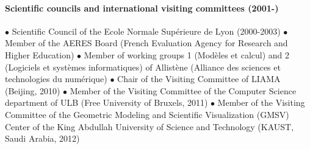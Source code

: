 \paragraph{Scientific councils and international visiting committees (2001-)} \mbox{}


$\bullet$  Scientific Council of the Ecole Normale Sup\'erieure de Lyon (2000-2003)
$\bullet$  Member of the AERES Board (French Evaluation Agency for
  Research and Higher Education)
$\bullet$  Member of working groups 1 (Mod\`eles et calcul) and 2
  (Logiciels et systèmes informatiques) of Allist\`ene (Alliance des sciences et technologies du num\'erique)
$\bullet$  Chair of the Visiting Committee of LIAMA (Beijing, 2010)
$\bullet$  Member of the Visiting Committee of the Computer Science department of ULB (Free University of Bruxels, 2011)
$\bullet$    Member of the Visiting Committee of the Geometric Modeling and Scientific Visualization (GMSV) Center of the King Abdullah University of Science and Technology (KAUST, Saudi Arabia, 2012)



